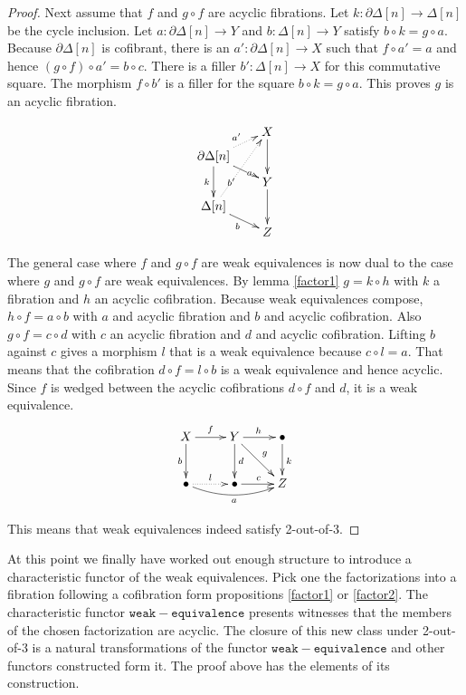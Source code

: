 \documentclass{tac}
\newcommand\of{:}
\newcommand\simplex\Delta
\newcommand\cycle{\partial\Delta}
\newcommand\code\mathtt
\begin{document}
\begin{proof}
Next assume that $f$ and $g\circ f$ are acyclic fibrations. Let $k\of\cycle[n]\to\simplex[n]$ be the cycle inclusion. Let $a\of\cycle[n]\to Y$ and $b\of\simplex[n]\to Y$ satisfy $b\circ k = g \circ a$. Because $\cycle[n]$ is cofibrant, there is an $a'\of \cycle[n]\to X$ such that $f\circ a' = a$ and hence $(g\circ f)\circ a' = b\circ c$. There is a filler $b'\of\simplex[n]\to X$ for this commutative square. The morphism $f\circ b'$ is a filler for the square $b\circ k = g \circ a$. This proves $g$ is an acyclic fibration.

\[\xy
(14\halfrootthree,28)*+{X}="x", (0,21)*+{\cycle[n]}="v", (14\halfrootthree,14)*+{Y}="y", (0,7)*+{\simplex[n]}="w", (14\halfrootthree,0)*+{Z}="z"
\ar@{.>}^{a'} "v";"x" \ar|(.67)a "v";"y" \ar_k "v";"w"
\ar@{.>}|(.33){b'} "w";"x" \ar_b "w";"z"
\ar "x";"y" \ar "y";"z"
\endxy\]

The general case where $f$ and $g\circ f$ are weak equivalences is now dual to the case where $g$ and $g\circ f$ are weak equivalences. By lemma \ref{factor1} $g=k\circ h$ with $k$ a fibration and $h$ an acyclic cofibration. Because weak equivalences compose, $h\circ f = a\circ b$ with $a$ and acyclic fibration and $b$ and acyclic cofibration. 
Also $g\circ f = c\circ d$ with $c$ an acyclic fibration and $d$ and acyclic cofibration. 
Lifting $b$ against $c$ gives a morphism $l$ that is a weak equivalence because $c\circ l = a$. That means that the cofibration $d\circ f = l\circ b$ is a weak equivalence and hence acyclic. Since $f$ is wedged between the acyclic cofibrations $d\circ f$ and $d$, it is a weak equivalence. 
\[\xymatrix{
X\ar[r]^f\ar[d]_b & Y\ar[r]^h\ar[d]^d\ar[dr]^g & \bullet\ar[d]^k\\
\bullet\ar@/_2ex/[rr]_a\ar@{.>}[r]^l & \bullet\ar[r]^c & Z
}\]

This means that weak equivalences indeed satisfy 2-out-of-3.
\end{proof}

\begin{remark} At this point we finally have worked out enough structure to introduce a characteristic functor of the weak equivalences. Pick one the factorizations into a fibration following a cofibration form propositions \ref{factor1} or \ref{factor2}. The characteristic functor $\code{weak-equivalence}$ presents witnesses that the members of the chosen factorization are acyclic. The closure of this new class under 2-out-of-3 is a natural transformations of the functor $\code{weak-equivalence}$ and other functors constructed form it. The proof above has the elements of its construction. \end{remark}
\end{document}
